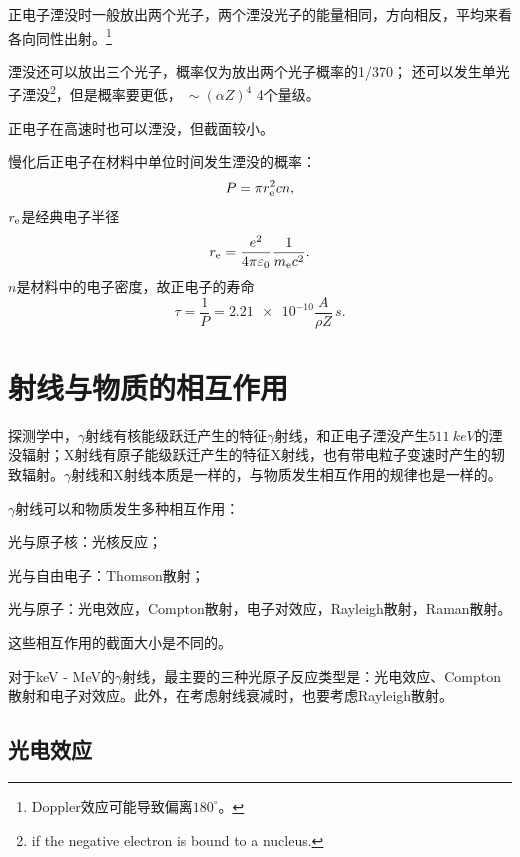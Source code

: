 正电子湮没时一般放出两个光子，两个湮没光子的能量相同，方向相反，平均来看各向同性出射。\footnote{Doppler效应可能导致偏离$180^\circ$。}

湮没还可以放出三个光子，概率仅为放出两个光子概率的1/370；
还可以发生单光子湮没\footnote{if the negative electron is bound to a nucleus.}，但是概率要更低，$~\sim(\alpha Z)^4$ 4个量级。

正电子在高速时也可以湮没，但截面较小。

慢化后正电子在材料中单位时间发生湮没的概率：
\[
	P=\pi r_\mathrm e^2cn,
\]
$r_\mathrm e$是经典电子半径
\[
	r_\mathrm e=\frac{e^2}{4\pi\varepsilon_0}\frac1{m_\mathrm e c^2}.
\]
$n$是材料中的电子密度，故正电子的寿命
\[
	\tau=\frac1P=\num{2.21e-10}\frac{A}{\rho Z}\,\si{s}.
\]

\section{\textgamma 射线与物质的相互作用}

探测学中，$\gamma$射线有核能级跃迁产生的特征$\gamma$射线，和正电子湮没产生$\SI{511}{keV}$的湮没辐射；X射线有原子能级跃迁产生的特征X射线，也有带电粒子变速时产生的轫致辐射。$\gamma$射线和X射线本质是一样的，与物质发生相互作用的规律也是一样的。

$\gamma$射线可以和物质发生多种相互作用：
\begin{compactitem}
	\item 光与原子核：光核反应；
	\item 光与自由电子：Thomson散射；
	\item 光与原子：光电效应，Compton散射，电子对效应，Rayleigh散射，Raman散射。
\end{compactitem}
这些相互作用的截面大小是不同的。

对于keV - MeV的$\gamma$射线，最主要的三种光原子反应类型是：光电效应、Compton散射和电子对效应。此外，在考虑射线衰减时，也要考虑Rayleigh散射。

\subsection{光电效应}

